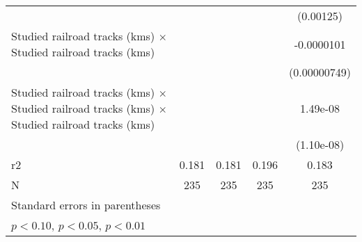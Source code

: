 {\begin{tabular}{l*{4}{c}}
                    &                     &                     &                     &   (0.00125)         \\
[1em]
Studied railroad tracks (kms) $\times$ Studied railroad tracks (kms)&                     &                     &                     &  -0.0000101         \\
                    &                     &                     &                     &(0.00000749)         \\
[1em]
Studied railroad tracks (kms) $\times$ Studied railroad tracks (kms) $\times$ Studied railroad tracks (kms)&                     &                     &                     &    1.49e-08         \\
                    &                     &                     &                     &  (1.10e-08)         \\
\hline
r2                  &       0.181         &       0.181         &       0.196         &       0.183         \\
N                   &         235         &         235         &         235         &         235         \\
\hline\hline
\multicolumn{5}{l}{\footnotesize Standard errors in parentheses}\\
\multicolumn{5}{l}{\footnotesize \sym{*} \(p<0.10\), \sym{**} \(p<0.05\), \sym{***} \(p<0.01\)}\\
\end{tabular}
}
